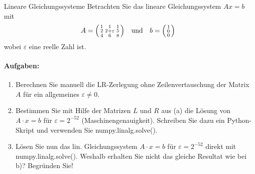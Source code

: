 \begin{example2}{Lineare Gleichungssysteme}
Betrachten Sie das lineare Gleichungssystem $Ax = b$ mit
$$A = \begin{psmallmatrix}
1 & 1 & 1\\
2 & 2+\varepsilon & 5\\
4 & 6 & 8
\end{psmallmatrix}
\quad \text{und} \quad
b = \begin{psmallmatrix}
1\\
0\\
0
\end{psmallmatrix}$$
wobei $\varepsilon$ eine reelle Zahl ist.

\paragraph{Aufgaben:}
\begin{enumerate}
    \item Berechnen Sie manuell die LR-Zerlegung ohne Zeilenvertauschung der Matrix $A$ für ein allgemeines $\varepsilon \neq 0$.
    
    \item Bestimmen Sie mit Hilfe der Matrizen $L$ und $R$ aus (a) die Lösung von $A \cdot x = b$ für $\varepsilon = 2^{-52}$ (Maschinengenauigkeit). Schreiben Sie dazu ein Python-Skript und verwenden Sie numpy.linalg.solve().
    
    \item Lösen Sie nun das lin. Gleichungssystem $A \cdot x = b$ für $\varepsilon = 2^{-52}$ direkt mit numpy.linalg.solve(). Weshalb erhalten Sie nicht das gleiche Resultat wie bei b)? Begründen Sie!
\end{enumerate}
\end{example2}

